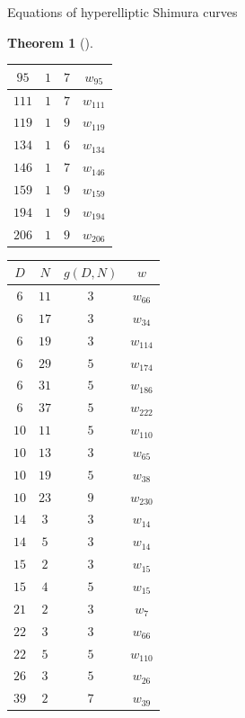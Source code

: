 \documentclass{amsart}
\newtheorem{theorem}{Theorem}
\theoremstyle{definition}
\begin{document}
\begin{section}{Equations of hyperelliptic Shimura curves}
\begin{theorem}[{\cite[Theorems 7 and 8]{Ogg}}]
\begin{table}[htb]
\begin{minipage}[b]{0.45\linewidth}
\begin{tabular}{|c|c|c|c|}
$95$&$1$&$7$&$w_{95}$\\
\hline

$111$&$1$&$7$&$w_{111}$\\
\hline

$119$&$1$&$9$&$w_{119}$\\
\hline
$134$&$1$&$6$&$w_{134}$\\
\hline
$146$&$1$&$7$&$w_{146}$\\
\hline
$159$&$1$&$9$&$w_{159}$\\
\hline

$194$&$1$&$9$&$w_{194}$\\
\hline
$206$&$1$&$9$&$w_{206}$\\
\hline
\end{tabular}
\end{minipage}
\hspace{0.5cm}
\begin{minipage}[b]{0.45\linewidth}
\centering
\begin{tabular}{|c|c|c|c|}
\hline
$D$&$N$&$g(D,N)$&$w$\\
\hline
$6$&$11$&$3$&$w_{66}$\\
\hline
$6$&$17$&$3$&$w_{34}$\\
\hline
$6$&$19$&$3$&$w_{114}$\\
\hline
$6$&$29$&$5$&$w_{174}$\\
\hline
$6$&$31$&$5$&$w_{186}$\\
\hline
$6$&$37$&$5$&$w_{222}$\\
\hline
$10$&$11$&$5$&$w_{110}$\\
\hline
$10$&$13$&$3$&$w_{65}$\\
\hline
$10$&$19$&$5$&$w_{38}$\\
\hline
$10$&$23$&$9$&$w_{230}$\\
\hline
$14$&$3$&$3$&$w_{14}$\\
\hline
$14$&$5$&$3$&$w_{14}$\\
\hline
$15$&$2$&$3$&$w_{15}$\\
\hline
$15$&$4$&$5$&$w_{15}$\\
\hline
$21$&$2$&$3$&$w_{7}$\\
\hline
$22$&$3$&$3$&$w_{66}$\\
\hline
$22$&$5$&$5$&$w_{110}$\\
\hline
$26$&$3$&$5$&$w_{26}$\\
\hline
$39$&$2$&$7$&$w_{39}$\\
\hline
\end{tabular}
\end{minipage}
\end{table}
\end{theorem}


\end{section}
\end{document}
